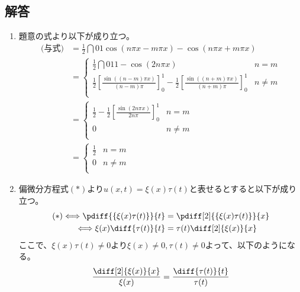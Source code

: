 \subsection{解答}
\begin{enumerate}[(1)]
    \item 題意の式より以下が成り立つ。
        \begin{align*}
            \mbox{(与式)} 
            & = \frac{1}{2}\dint{0}{1}{\cos (n\pi x - m\pi x) - \cos (n\pi x + m\pi x)}\\
            & = 
            \begin{cases}
                \frac{1}{2}\dint{0}{1}{1 - \cos (2n\pi x)} & n = m\\
                \frac{1}{2}\left[\frac{\sin ((n - m)\pi x)}{(n - m)\pi}\right]_{0}^{1} - \frac{1}{2}\left[\frac{\sin ((n + m)\pi x)}{(n + m)\pi}\right]_{0}^{1} & n \neq m\\
            \end{cases}\\
            & = 
            \begin{cases}
                \frac{1}{2} - \frac{1}{2}\left[\frac{\sin (2n\pi x)}{2n\pi}\right]_{0}^{1} & n = m\\
                0 & n \neq m\\
            \end{cases}\\
            & = 
            \begin{cases}
                \frac{1}{2} & n = m\\
                0 & n \neq m\\
            \end{cases}
        \end{align*}
    \item 偏微分方程式$(*)$より$u(x, t) = \xi (x)\tau (t)$と表せるとすると以下が成り立つ。
        \begin{align*}
            (*) \Longleftrightarrow
            \pdiff{\{\xi (x)\tau (t)\}}{t} & = \pdiff[2]{\{\xi (x)\tau (t)\}}{x}\\
            \Longleftrightarrow
            \xi (x)\diff{\tau (t)}{t} & = \tau (t)\diff[2]{\xi (x)}{x}
        \end{align*}
        ここで、$\xi (x)\tau(t) \neq 0$より$\xi (x) \neq 0, \tau (t) \neq 0$よって、以下のようになる。
        \begin{align*}
            \frac{\diff[2]{\xi (x)}{x}}{\xi (x)} &= \frac{\diff{\tau (t)}{t}}{\tau (t)}\\

\end{align*}
\end{enumerate}
